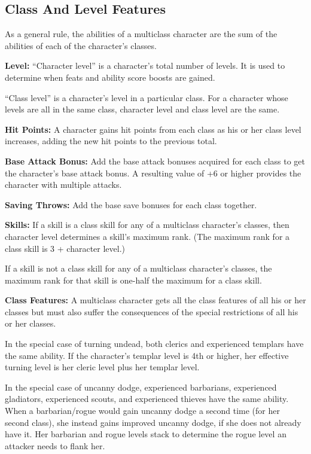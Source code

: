 \subsection{Class And Level Features}
As a general rule, the abilities of a multiclass character are the sum of the abilities of each of the character's classes.

\textbf{Level:} ``Character level'' is a character's total number of levels. It is used to determine when feats and ability score boosts are gained.

``Class level'' is a character's level in a particular class. For a character whose levels are all in the same class, character level and class level are the same.

\textbf{Hit Points:} A character gains hit points from each class as his or her class level increases, adding the new hit points to the previous total.

\textbf{Base Attack Bonus:} Add the base attack bonuses acquired for each class to get the character's base attack bonus. A resulting value of +6 or higher provides the character with multiple attacks.

\textbf{Saving Throws:} Add the base save bonuses for each class together.

\textbf{Skills:} If a skill is a class skill for any of a multiclass character's classes, then character level determines a skill's maximum rank. (The maximum rank for a class skill is 3 + character level.)

If a skill is not a class skill for any of a multiclass character's classes, the maximum rank for that skill is one-half the maximum for a class skill.

\textbf{Class Features:} A multiclass character gets all the class features of all his or her classes but must also suffer the consequences of the special restrictions of all his or her classes.

In the special case of turning undead, both clerics and experienced templars have the same ability. If the character's templar level is 4th or higher, her effective turning level is her cleric level plus her templar level.

In the special case of uncanny dodge, experienced barbarians, experienced gladiators, experienced scouts, and experienced thieves have the same ability. When a barbarian/rogue would gain uncanny dodge a second time (for her second class), she instead gains improved uncanny dodge, if she does not already have it. Her barbarian and rogue levels stack to determine the rogue level an attacker needs to flank her.

